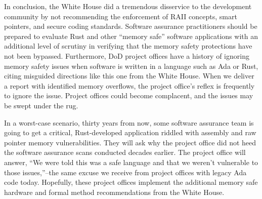 In conclusion, the White House did a tremendous disservice to the development community by not recommending the enforcement of RAII concepts\autocite{20240902:hood2}, smart pointers, and secure coding standards. Software assurance practitioners should be prepared to evaluate Rust and other ``memory safe'' software applications with an additional level of scrutiny in verifying that the memory safety protections have not been bypassed. Furthermore, DoD project offices have a history of ignoring memory safety issues when software is written in a language such as Ada or Rust, citing misguided directions like this one from the White House. When we deliver a report with identified memory overflows, the project office's reflex is frequently to ignore the issue. Project offices could become complacent, and the issues may be swept under the rug.

In a worst-case scenario, thirty years from now, some software assurance team is going to get a critical, Rust-developed application riddled with assembly and raw pointer memory vulnerabilities. They will ask why the project office did not heed the software assurance scans conducted decades earlier. The project office will answer, ``We were told this was a safe language and that we weren't vulnerable to those issues,''--the same excuse we receive from project offices with legacy Ada code today. Hopefully, these project offices implement the additional memory safe hardware and formal method recommendations from the White House.
